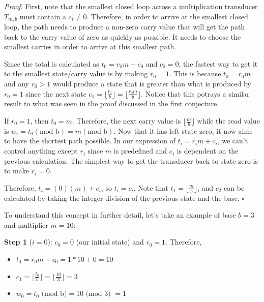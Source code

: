 \documentclass{article}
\begin{document}
\noindent
\textit{Proof.} First, note that the smallest closed loop across a multiplication transducer $T_{m,b}$ must contain a $c_i \neq 0$. Therefore, in order to arrive at the smallest closed loop, the path needs to produce a non-zero carry value that will get the path back to the carry value of zero as quickly as possible. It needs to choose the smallest carries in order to arrive at this smallest path. \vspace{\baselineskip}

\noindent
Since the total is calculated as $t_0 = r_0m + c_0$ and $c_0 = 0$, the fastest way to get it to the smallest state/carry value is by making $r_0 = 1$. This is because $t_0 = r_0m$ and any $r_0 > 1$ would produce a state that is greater than what is produced by $r_0 = 1$ since the next state $c_1 = \lfloor{\frac{t_0}{b}}\rfloor = \lfloor{\frac{r_0m}{b}}\rfloor$.  Notice that this potrays a similar result to what was seen in the proof discussed in the first conjecture. \vspace{\baselineskip}

\noindent
If $r_0 = 1$, then $t_0 = m$. Therefore, the next carry value is $\lfloor{\frac{m}{b}}\rfloor$ while the read value is $w_i = t_0 ( \text{mod b}) = m (\text{mod b})$. Now that it has left state zero, it now aims to have the shortest path possible. In our expression of $t_i = r_im + c_i$, we can’t control anything except $r_i$ since $m$ is predefined and $c_i$ is dependent on the previous calculation. The simplest way to get the transducer back to state zero is to make $r_i = 0$. \vspace{\baselineskip}

\noindent
Therefore, $t_i = (0)(m) + c_i$, so $t_i = c_i$. Note that $t_1 = \lfloor{\frac{m}{b}}\rfloor$, and $c_2$ can be calculated by taking the integer division of the previous state and the base. $\square$ \vspace{\baselineskip}

\noindent
To understand this concept in further detail, let's take an example of base $b = 3$ and multiplier $m = 10$: \vspace{\baselineskip}

\noindent 
\textbf{Step 1} ($i=0$): $c_0 = 0$ (our initial state) and $r_0 = 1$. Therefore,
\begin{itemize}
  \item $t_0 = r_0m + c_0 = 1*10 + 0 = 10$
  \item $c_1 = \lfloor{\frac{t_0}{b}} \rfloor = \lfloor{\frac{10}{3}} \rfloor = 3$
  \item $w_0 = t_0 \text{ (mod b)} = 10 \text{ (mod 3) } = 1$
\end{itemize} \vspace{\baselineskip}
\end{document}
